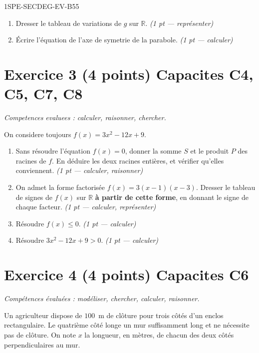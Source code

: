 \begin{evaluation}{1SPE-SECDEG-EV-B}{55}
\begin{enumerate}
  \item Dresser le tableau de variations de $g$ sur $\mathbb{R}$.
  \hfill\textit{(1 pt — représenter)}

  \item Écrire l'équation de l'axe de symetrie de la parabole.
  \hfill\textit{(1 pt — calculer)}
\end{enumerate}

\section*{Exercice 3 \hfill (4 points) \hfill Capacites C4, C5, C7, C8}

\textit{Competences evaluees : calculer, raisonner, chercher.}

\medskip
On considere toujours $f(x) = 3x^2 - 12x + 9$.

\begin{enumerate}
  \item Sans résoudre l'équation $f(x)=0$, donner la somme $S$ et le produit $P$
  des racines de $f$. En déduire les deux racines entières, et vérifier qu'elles
  conviennent.
  \hfill\textit{(1 pt — calculer, raisonner)}

  \item On admet la forme factorisée $f(x) = 3(x-1)(x-3)$. Dresser le tableau de
  signes de $f(x)$ sur $\mathbb{R}$ \textbf{à partir de cette forme}, en donnant
  le signe de chaque facteur.
  \hfill\textit{(1 pt — calculer, représenter)}

  \item Résoudre $f(x) \leq 0$.
  \hfill\textit{(1 pt — calculer)}

  \item Résoudre $3x^2 - 12x + 9 > 0$.
  \hfill\textit{(1 pt — calculer)}
\end{enumerate}

\section*{Exercice 4 \hfill (4 points) \hfill Capacites C6}

\textit{Compétences évaluées : modéliser, chercher, calculer, raisonner.}

\medskip
Un agriculteur dispose de $100$~m de clôture pour trois côtés d'un enclos
rectangulaire. Le quatrième côté longe un mur suffisamment long et ne
nécessite pas de clôture. On note $x$ la longueur, en mètres, de chacun des
deux côtés perpendiculaires au mur.


\end{evaluation}
